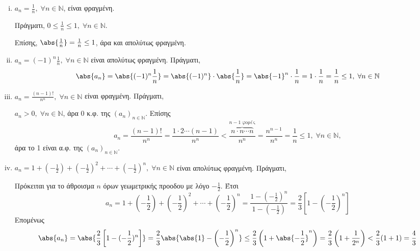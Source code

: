 \documentclass[main.tex]{subfiles}
\begin{document}
\begin{examples}
\item {}  
    \begin{enumerate}[i)]
        \item $ a_{n}= \frac{1}{n}, \; \forall n \in \mathbb{N} $, είναι 
            φραγμένη.

            Πράγματι, $ 0 \leq \frac{1}{n} \leq 1, \; \forall n \in 
            \mathbb{N} $. 

            Επίσης, $ \abs{\frac{1}{n}} = \frac{1}{n} \leq 1 $, άρα και 
            απολύτως φραγμένη.
        \item $ a_{n}=(-1)^{n} \frac{1}{n}, \; \forall n \in \mathbb{N} $ 
            είναι απολύτως φραγμένη. Πράγματι,
            \[
                \abs{a_{n}} = \abs{(-1)^{n} \frac{1}{n}} = \abs{(-1)^{n}} 
                \cdot \abs{\frac{1}{n}} = \abs{-1}^{n} \cdot \frac{1}{n}
                = 1 \cdot \frac{1}{n} = \frac{1}{n} \leq 1, \; \forall n 
                \in \mathbb{N}
            \] 

        \item $ a_{n}= \frac{(n-1)!}{n^{n}}, \; \forall n \in \mathbb{N} $
            είναι φραγμένη. Πράγματι, 

                 $ a_{n} > 0, \; \forall n \in 
                    \mathbb{N}$, άρα 0 κ.φ. της $( a_{n})_{n \in 
                    \mathbb{N}} $. 
                 Επίσης 
                    \[
                        a_{n}= \frac{(n-1)!}{n^{n}} = \frac{1 \cdot 2 
                            \cdots (n-1)}{n^{n}} < \frac{\overbrace{n 
                                \cdot n \cdots n} ^{n-1 \; 
                        \text{φορές}}}{n^{n}} = \frac{n^{n-1}}{n^{n}} =
                        \frac{1}{n} \leq 1, \; \forall n \in \mathbb{N},
                    \]
                    άρα το 1 είναι α.φ. της $(a_{n})_{n \in \mathbb{N}}$. 

        \item $ a_{n}= 1 + \left(- \frac{1}{2} \right) + \left(- 
                \frac{1}{2}\right)^{2} + \cdots + \left(-\frac{1}{2} 
            \right) ^{n}, 
            \; \forall n \in \mathbb{N} $ είναι απολύτως φραγμένη. Πράγματι,

            Πρόκειται για το άθροισμα $ n $ όρων γεωμετρικής προοδου με 
            λόγο $ -\frac{1}{2} $. Έτσι
            \[ a_{n} = 1 + \left(- \frac{1}{2}\right) + \left(- \frac{1}{2} 
                \right)^{2} + \cdots + \left(- \frac{1}{2} \right)^{n} = 
                \frac{1 - (- \frac{1}{2} )^{n}}{1 - (- \frac{1}{2})} = 
            \frac{2}{3} \left[1 - \left(- \frac{1}{2} \right)^{n}\right] \]
            Επομένως
            \[
                \abs{a_{n}} = \abs{\frac{2}{3} \left[1-(- \frac{1}{2} )^{n}
                        \right]} = \frac{2}{3} \abs{\abs{1} - \left(- 
                \frac{1}{2}\right)^{n}} \leq 
                \frac{2}{3} \left(1 + \abs{-\frac{1}{2} }^{n} \right) = 
                \frac{2}{3} \left(1+ \frac{1}{2^{n}}\right) < \frac{2}{3}
                (1+1) = \frac{4}{3} 
            \] 


\end{enumerate}
\end{examples}
\end{document}
